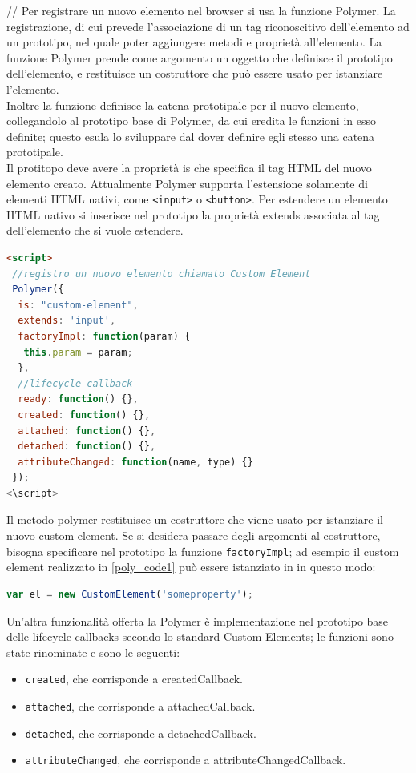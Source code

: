 //
Per registrare un nuovo elemento nel browser si usa la funzione Polymer. La registrazione, di cui  prevede l’associazione di un tag riconoscitivo dell’elemento ad un prototipo, nel quale poter aggiungere metodi e proprietà all’elemento. La funzione Polymer prende come argomento un oggetto che definisce il prototipo dell’elemento, e restituisce un costruttore che può essere usato per istanziare l’elemento.
\\
Inoltre la funzione definisce la catena prototipale per il nuovo elemento, collegandolo al prototipo base di Polymer, da cui eredita le funzioni in esso definite; questo esula lo sviluppare dal dover definire egli stesso una catena prototipale.
\\
Il protitopo deve avere la proprietà is che specifica il tag HTML del nuovo elemento creato. Attualmente Polymer supporta l’estensione solamente di elementi HTML nativi, come \texttt{<input>} o \texttt{<button>}. Per estendere un elemento HTML nativo si inserisce nel prototipo la proprietà extends associata al tag dell’elemento che si vuole estendere. 
\begin{lstlisting}[language=html, label={poly_code1}]
<script>
 //registro un nuovo elemento chiamato Custom Element
 Polymer({
  is: "custom-element",
  extends: 'input',
  factoryImpl: function(param) {
   this.param = param;
  },
  //lifecycle callback
  ready: function() {},
  created: function() {},
  attached: function() {},
  detached: function() {},
  attributeChanged: function(name, type) {}
 });
<\script>
\end{lstlisting}
Il metodo polymer restituisce un costruttore che viene usato per istanziare il nuovo custom element. Se si desidera passare degli argomenti al costruttore, bisogna specificare nel prototipo la funzione \texttt{factoryImpl}; ad esempio il custom element realizzato in \ref{poly_code1} può essere istanziato in in questo modo:
\begin{lstlisting}[language=javascript]
var el = new CustomElement('someproperty');
\end{lstlisting}
Un’altra funzionalità offerta la Polymer è implementazione nel prototipo base delle lifecycle callbacks secondo lo standard Custom Elements; le funzioni sono state rinominate e sono le seguenti:
\begin{itemize}
\item \texttt{created}, che corrisponde a createdCallback.
\item \texttt{attached}, che corrisponde a attachedCallback.
\item \texttt{detached}, che corrisponde a detachedCallback.
\item \texttt{attributeChanged}, che corrisponde a attributeChangedCallback.
\end{itemize}
